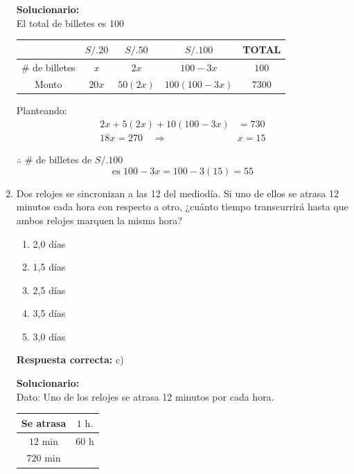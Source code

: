 \begin{enumerate}
	\vspace{2mm}
	
	\textbf{Solucionario:}\\
	El total de billetes es 100
	\begin{center}
		\begin{tabular}{|c|c|c|c|c|}
			\hline
			& $S/. 20$ & $S/. 50$ & $S/. 100$ & TOTAL \\ \hline
			\# de billetes & $x$ & $2x$ & $100 - 3x$ & $100$ \\ \hline
			Monto & $20x$ & $50(2x)$ & $100(100 - 3x)$ & $7300$ \\ \hline
		\end{tabular}
	\end{center}
	
	Planteando:
	\begin{align*}
		2x + 5(2x) + 10(100 - 3x) &= 730 \\
		18x = 270 \quad \Rightarrow \quad &x = 15
	\end{align*}
	
	$\therefore$ \# de billetes de $S/. 100$
	\begin{equation*}
		\text{es } 100 - 3x = 100 - 3(15) = 55
	\end{equation*}
	
	
	
	
	\vspace{6mm}
	
	\item Dos relojes se sincronizan a las 12 del mediodía. Si uno de ellos se atrasa 12 minutos cada hora con respecto a otro, ¿cuánto tiempo transcurrirá hasta que ambos relojes marquen la misma hora?
	\begin{enumerate}[label=\alph*)]
		\item 2,0 días
		\item 1,5 días
		\item 2,5 días
		\item 3,5 días
		\item 3,0 días
	\end{enumerate}
	\textbf{Respuesta correcta:} c)
	
	\vspace{2mm}
	
	\textbf{Solucionario:}\\
	Dato: Uno de los relojes se atrasa 12 minutos por cada hora.
	
	\begin{center}
		\begin{tabular}{c|c}
			Se atrasa & $1 \text{ h.}$ \\ \hline
			$12 \text{ min}$ & $60 \text{ h}$ \\
			$720 \text{ min}$ & 
		\end{tabular}
	\end{center}
	

\end{enumerate}
